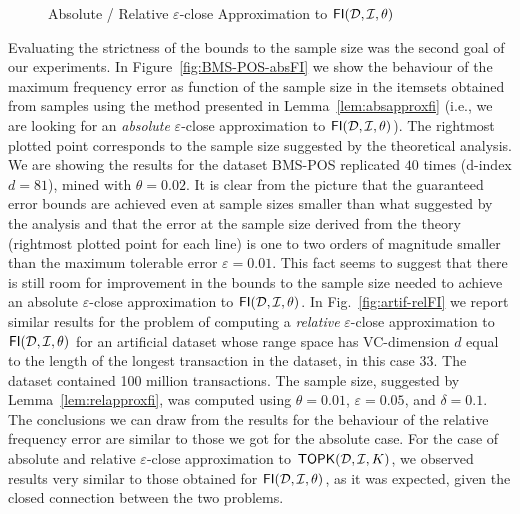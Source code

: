 \begin{figure}[tp]
  \centering
 \hfill
  \caption{Absolute / Relative $\varepsilon$-close Approximation to $\mathsf{FI}({\cal D},{\cal I},\theta)$} 
  \label{fig:fiapprox}
\end{figure}

Evaluating the strictness of the bounds to the sample size was the second goal
of our experiments. In Figure~\ref{fig:BMS-POS-absFI} we show the behaviour of
the maximum frequency error as function of the sample size in the itemsets
obtained from samples using the method presented in Lemma~\ref{lem:absapproxfi}
(i.e., we are looking for an \emph{absolute} $\varepsilon$-close approximation
to $\mathsf{FI}({\cal D},{\cal I},\theta)$). The rightmost plotted point corresponds to the
sample size suggested by the theoretical analysis. We are showing the results
for the dataset BMS-POS replicated $40$ times (d-index $d=81$), mined with
$\theta=0.02$. It is clear from the picture that the guaranteed error bounds are
achieved even at sample sizes smaller than what suggested by the analysis and
that the error at the sample size derived from the theory (rightmost plotted
point for each line) is one to two orders of magnitude smaller than the maximum tolerable
error $\varepsilon=0.01$. This fact seems to suggest that there is still room for
improvement in the bounds to the sample size needed to achieve an absolute
$\varepsilon$-close approximation to $\mathsf{FI}({\cal D},{\cal I},\theta)$.
In Fig.~\ref{fig:artif-relFI}
we report similar results for the problem of computing a \emph{relative}
$\varepsilon$-close approximation to $\mathsf{FI}({\cal D},{\cal I},\theta)$ for an artificial
dataset whose range space has VC-dimension $d$ equal to the length of the
longest transaction in the dataset, in this case $33$. The dataset contained 100
million transactions. The sample size, suggested by Lemma~\ref{lem:relapproxfi},
was computed using $\theta=0.01$, $\varepsilon=0.05$, and $\delta=0.1$.
The conclusions we can draw from the results for the behaviour of the
relative frequency error are similar to those we got for the absolute case.
For the case of absolute and relative $\varepsilon$-close approximation to
$\mathsf{TOPK}({\cal D},{\cal I},K)$, we observed results very similar to those obtained for
$\mathsf{FI}({\cal D},{\cal I},\theta)$, as it was expected, given the closed connection between
the two problems. 

